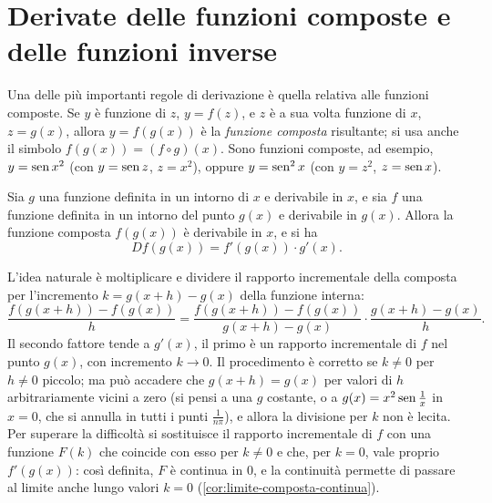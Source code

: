 \section{Derivate delle funzioni composte e delle funzioni inverse}
\label{sec:composte-inverse}

Una delle più importanti regole di derivazione è quella relativa alle funzioni composte.
Se $y$ è funzione di $z$, $y=f(z)$, e $z$ è a sua volta funzione di $x$, $z=g(x)$, allora
$y=f(g(x))$ è la \emph{funzione composta} risultante; si usa anche il simbolo
$f(g(x))=(f\circ g)(x)$. Sono funzioni composte, ad esempio, $y=\operatorname{sen} x^{2}$ (con
$y=\operatorname{sen} z$, $z=x^{2}$), oppure $y=\operatorname{sen}^{2}x$ (con $y=z^{2}$, $z=\operatorname{sen} x$).

\begin{teorema}\label{teo:derivata-composta}
Sia $g$ una funzione definita in un intorno di $x$ e derivabile in $x$, e sia $f$ una
funzione definita in un intorno del punto $g(x)$ e derivabile in $g(x)$. Allora la
funzione composta $f(g(x))$ è derivabile in $x$, e si ha
\begin{equation}\label{eq:derivata-composta}
  D f(g(x))=f'(g(x))\cdot g'(x).
\end{equation}
\end{teorema}

\begin{schema}
\end{schema}

\begin{strategia}
L'idea naturale è moltiplicare e dividere il rapporto incrementale della composta per
l'incremento $k=g(x+h)-g(x)$ della funzione interna:
\[
  \frac{f(g(x+h))-f(g(x))}{h}=\frac{f(g(x+h))-f(g(x))}{g(x+h)-g(x)}\cdot\frac{g(x+h)-g(x)}{h}.
\]
Il secondo fattore tende a $g'(x)$, il primo è un rapporto incrementale di $f$ nel punto
$g(x)$, con incremento $k\to0$. Il procedimento è corretto se $k\neq0$ per $h\neq0$
piccolo; ma può accadere che $g(x+h)=g(x)$ per valori di $h$ arbitrariamente vicini a
zero (si pensi a una $g$ costante, o a $g(x)=x^{2}\operatorname{sen}\frac1x$ in $x=0$, che si annulla in
tutti i punti $\frac1{n\pi}$), e allora la divisione per $k$ non è lecita. Per superare la
difficoltà si sostituisce il rapporto incrementale di $f$ con una funzione $F(k)$ che
coincide con esso per $k\neq0$ e che, per $k=0$, vale proprio $f'(g(x))$: così definita,
$F$ è continua in $0$, e la continuità permette di passare al limite anche lungo valori
$k=0$ (\cref{cor:limite-composta-continua}).
\end{strategia}

